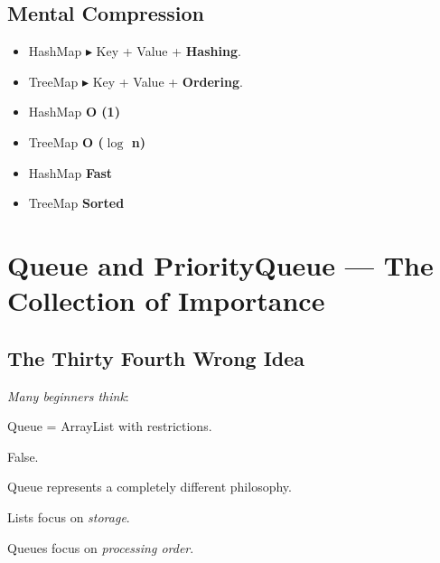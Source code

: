 \documentclass[11pt,a4paper]{book}
\begin{document}
\section{Mental Compression}
\begin{itemize}
\item HashMap $\blacktriangleright$
Key + Value + \textcolor{RosettaJade}{\textbf{Hashing}}.

\item TreeMap $\blacktriangleright$
Key + Value + \textcolor{RosettaOrange}{\textbf{Ordering}}.

\item HashMap \textbf{O (1)}

\item TreeMap \textbf{O ($\log$ n)}

\item HashMap \textcolor{RosettaRoyalPurple}{\textbf{Fast}}

\item TreeMap \textcolor{RosettaOrange}{\textbf{Sorted}}
\end{itemize}
\chapter[Queue and PriorityQueue]{Queue and PriorityQueue --- The Collection of Importance}

\section{The Thirty Fourth Wrong Idea}

\begin{trap}

\emph{Many beginners think}:

\textcolor{RosettaJade}{Queue} = \textcolor{RosettaRoyalPurple}{ArrayList}
with restrictions.

\textcolor{RosettaOrange}{False}.

Queue represents a completely
different philosophy.


Lists focus on \emph{storage}.


Queues focus on \emph{processing order}.
\end{trap}

\end{document}
